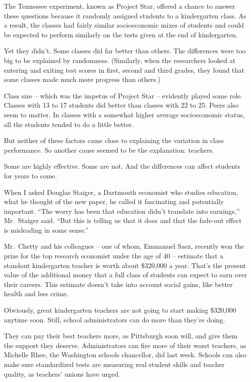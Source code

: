 ﻿\documentclass[12pt]{article}
\begin{document}
The Tennessee experiment, known as Project Star, offered a chance to answer these questions because
it randomly assigned students to a kindergarten class. As a result, the classes had fairly similar
socioeconomic mixes of students and could be expected to perform similarly on the tests given at the
end of kindergarten.

Yet they didn't. Some classes did far better than others. The differences were too big to be
explained by randomness. (Similarly, when the researchers looked at entering and exiting test scores
in first, second and third grades, they found that some classes made much more progress than
others.)

Class size -- which was the impetus of Project Star -- evidently played some role. Classes with 13
to 17 students did better than classes with 22 to 25. Peers also seem to matter. In classes with a
somewhat higher average socioeconomic status, all the students tended to do a little better.

But neither of these factors came close to explaining the variation in class performance. So another
cause seemed to be the explanation: teachers.

Some are highly effective. Some are not. And the differences can affect students for years to come.

When I asked Douglas Staiger, a Dartmouth economist who studies education, what he thought of the
new paper, he called it fascinating and potentially important. ``The worry has been that education
didn't translate into earnings,'' Mr.~Staiger said. ``But this is telling us that it does and that
the fade-out effect is misleading in some sense.''

Mr.~Chetty and his colleagues -- one of whom, Emmanuel Saez, recently won the prize for the top
research economist under the age of 40 -- estimate that a standout kindergarten teacher is worth
about \$320,000 a year. That's the present value of the additional money that a full class of
students can expect to earn over their careers. This estimate doesn't take into account social
gains, like better health and less crime.

Obviously, great kindergarten teachers are not going to start making \$320,000 anytime soon. Still,
school administrators can do more than they're doing.

They can pay their best teachers more, as Pittsburgh soon will, and give them the support they
deserve. Administrators can fire more of their worst teachers, as Michelle Rhee, the Washington
schools chancellor, did last week. Schools can also make sure standardized tests are measuring real
student skills and teacher quality, as teachers' unions have urged.
\end{document}
